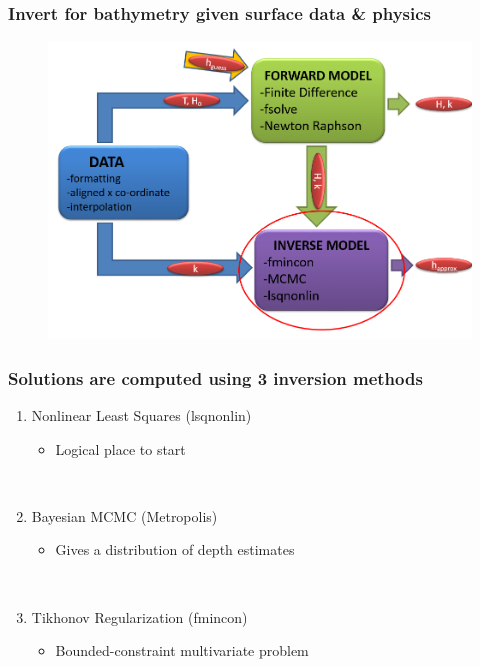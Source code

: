 \documentclass[7pt]{beamer}
\begin{document}
\begin{frame}
 	\frametitle{Invert for bathymetry given surface data \& physics}
		\begin{figure}
			\includegraphics[width=1.0\linewidth]{img/INV.png}
		\end{figure}
\end{frame}

\begin{frame}
	\frametitle{Solutions are computed using 3 inversion methods}
		\centering
		\begin{enumerate}
			\item Nonlinear Least Squares (lsqnonlin)
			\begin{itemize}
				\item Logical place to start
			\end{itemize}
			$\,$\\
			\item Bayesian MCMC (Metropolis)
			\begin{itemize}
				\item Gives a distribution of depth estimates
			\end{itemize}
			$\,$\\
			\item Tikhonov Regularization (fmincon)
			\begin{itemize}
				\item Bounded-constraint multivariate problem
			\end{itemize}
		\end{enumerate}
\end{frame}
\end{document}
